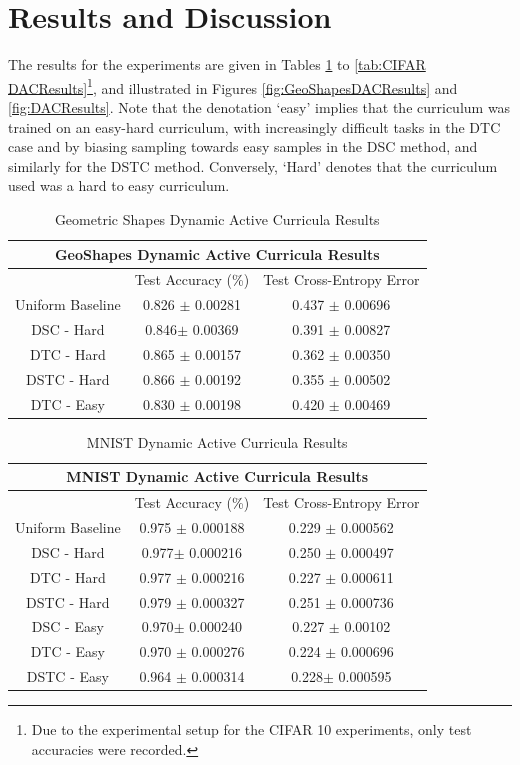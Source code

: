 \section{Results and Discussion}
The results for  the experiments are given in Tables \ref{tab:GeoShapes DACResults} to \ref{tab:CIFAR DACResults}\footnote{Due to the experimental setup for the CIFAR 10 experiments, only test accuracies were recorded.}, and illustrated in Figures \ref{fig:GeoShapesDACResults} and \ref{fig:DACResults}. Note that the denotation `easy' implies that the curriculum was trained on an easy-hard curriculum, with increasingly difficult tasks in the DTC case and by biasing sampling towards easy samples in the DSC method, and similarly for the DSTC method. Conversely, `Hard' denotes that the curriculum used was a hard to easy curriculum.
\begin{table}[h!]
\caption{Geometric Shapes Dynamic Active Curricula Results} \label{tab:GeoShapes DACResults}
\begin{tabular}{|c||c|c|}
\hline
\multicolumn{3}{|c|}{GeoShapes Dynamic Active Curricula Results} \\
\hline
 & Test Accuracy (\%) & Test Cross-Entropy Error \\
\hline
Uniform Baseline&  0.826 $\pm$ 0.00281 & 0.437 $\pm$ 0.00696 \\
\hline
DSC - Hard& 0.846$ \pm$ 0.00369 & 0.391 $\pm$ 0.00827 \\
\hline
DTC - Hard&  0.865  $\pm$ 0.00157 & 0.362 $\pm$ 0.00350 \\
\hline
DSTC - Hard & 0.866 $\pm$ 0.00192 & 0.355 $\pm$ 0.00502 \\
\hline
DTC - Easy & 0.830 $\pm$ 0.00198 & 0.420 $\pm$ 0.00469 \\
\hline
\end{tabular}
\end{table}

\begin{table}[h!]
\caption{MNIST Dynamic Active Curricula  Results} \label{tab:MNIST DACResults}
\begin{tabular}{|c||c|c|}
\hline
\multicolumn{3}{|c|}{MNIST Dynamic Active Curricula Results} \\
\hline
 & Test Accuracy (\%) & Test Cross-Entropy Error \\
\hline
Uniform Baseline&  0.975 $\pm$ 0.000188& 0.229 $\pm$ 0.000562 \\
\hline
DSC - Hard& 0.977$ \pm$ 0.000216& 0.250 $\pm$ 0.000497 \\
\hline
DTC - Hard&  0.977  $\pm$ 0.000216 & 0.227 $\pm$ 0.000611 \\
\hline
DSTC - Hard & 0.979 $\pm$ 0.000327 & 0.251 $\pm$ 0.000736\\
\hline
DSC - Easy& 0.970$ \pm$ 0.000240 & 0.227 $\pm$ 0.00102 \\
\hline
DTC - Easy & 0.970 $\pm$ 0.000276 & 0.224 $\pm$ 0.000696 \\
\hline
DSTC - Easy & 0.964 $\pm$ 0.000314 & 0.228$\pm$ 0.000595 \\
\hline
\end{tabular}
\end{table}

